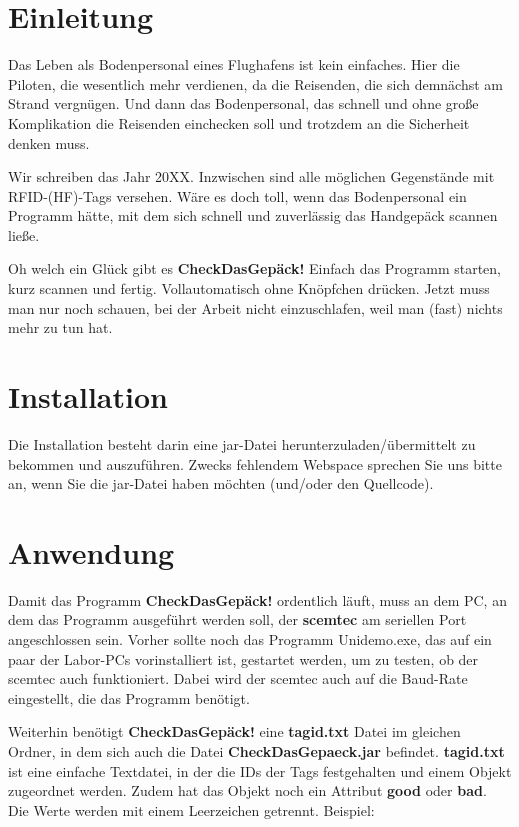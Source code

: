 \documentclass[paper=a4,fontsize=11pt,headsepline,footsepline,parskip=half]{scrartcl}
\begin{document}
\tableofcontents

\section{Einleitung}

Das Leben als Bodenpersonal eines Flughafens ist kein einfaches. Hier die Piloten, die wesentlich mehr verdienen,
da die Reisenden, die sich demnächst am Strand vergnügen. Und dann das Bodenpersonal, das schnell und ohne große
Komplikation die Reisenden einchecken soll und trotzdem an die Sicherheit denken muss.

Wir schreiben das Jahr 20XX. Inzwischen sind alle möglichen Gegenstände mit RFID-(HF)-Tags versehen. Wäre es doch
toll, wenn das Bodenpersonal ein Programm hätte, mit dem sich schnell und zuverlässig das Handgepäck scannen ließe.

Oh welch ein Glück gibt es \textbf{CheckDasGepäck!} Einfach das Programm starten, kurz scannen und fertig.
Vollautomatisch ohne Knöpfchen drücken. Jetzt muss man nur noch schauen, bei der Arbeit nicht einzuschlafen, weil
man (fast) nichts mehr zu tun hat.

\section{Installation}

Die \glqq Installation\grqq{} besteht darin eine jar-Datei herunterzuladen/übermittelt zu bekommen und auszuführen.
Zwecks fehlendem Webspace sprechen Sie uns bitte an, wenn Sie die jar-Datei haben möchten (und/oder den
Quellcode).

\section{Anwendung}

Damit das Programm \textbf{CheckDasGepäck!} ordentlich läuft, muss an dem PC, an dem das Programm ausgeführt
werden soll, der \textbf{scemtec} am seriellen Port angeschlossen sein. Vorher sollte noch das Programm
Unidemo.exe, das auf ein paar der Labor-PCs vorinstalliert ist, gestartet werden, um zu testen, ob der
scemtec auch funktioniert. Dabei wird der scemtec auch auf die Baud-Rate eingestellt, die das Programm benötigt.

Weiterhin benötigt \textbf{CheckDasGepäck!} eine \glqq \textbf{tagid.txt}\grqq{} Datei im gleichen Ordner, in dem
sich auch die Datei \glqq \textbf{CheckDasGepaeck.jar}\grqq{} befindet. \textbf{tagid.txt} ist eine einfache
Textdatei, in der die IDs der Tags festgehalten und einem Objekt zugeordnet werden. Zudem hat das Objekt noch
ein Attribut \textbf{good} oder \textbf{bad}. Die Werte werden mit einem Leerzeichen getrennt. Beispiel:
\end{document}
